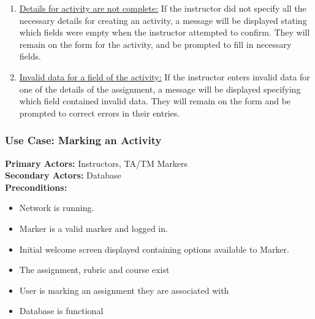 \documentclass{article}
\begin{document}
\begin{enumerate}
	\item \underline{Details for activity are not complete:} If the instructor did not specify
			all the necessary details for creating an activity, a message will be displayed
			stating which fields were empty when the instructor attempted to confirm.
			They will remain on the form for the activity, and be prompted to fill in necessary
			fields.
	\item \underline{Invalid data for a field of the activity:} If the instructor enters invalid
			data for one of the details of the assignment, a message will be displayed
			specifying which field contained invalid data. They will remain on the form and
			be prompted to correct errors in their entries.
\end{enumerate}


\subsubsection{Use Case: Marking an Activity}


\textbf{Primary Actors:} Instructors, TA/TM Markers \\
\textbf{Secondary Actors:} Database \\
\textbf{Preconditions:}
\begin{itemize}
\item Network is running.
\item Marker is a valid marker and logged in.
\item Initial welcome screen displayed containing options available to Marker.
\item The assignment, rubric and course exist
\item User is marking an assignment they are associated with
\item Database is functional
\end {itemize}
\end{document}
